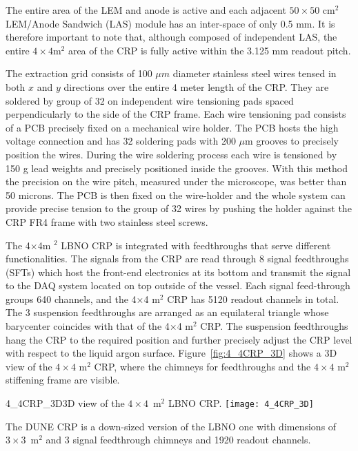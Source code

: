 The entire area of the LEM and anode is active and each adjacent $50\times50$ cm$^2$ LEM/Anode Sandwich (LAS) module has an inter-space of only 0.5 mm. It is therefore important  to note that, although composed of independent LAS, the  entire $4\times 4$m$^2$ area of the CRP is fully active within the 3.125 mm readout pitch.

The extraction grid consists of 100 $\mu$$m$ diameter stainless steel  wires tensed in both $x$ and $y$ directions over the entire 4 meter  length of the CRP. They are soldered by group of 32 on independent  wire tensioning pads spaced perpendicularly to the side of the CRP frame. Each wire  tensioning pad consists of a PCB precisely fixed on a mechanical wire  holder. The PCB hosts the high voltage connection and has 32 soldering pads with 200 $\mu$m grooves to precisely position the  wires. During the wire soldering process each wire is tensioned by 150 g lead weights and precisely positioned inside the grooves. With  this method the precision on the wire pitch, measured under the  microscope, was better than 50 microns. The PCB is then fixed on the  wire-holder and the whole system can provide precise tension to the  group of 32 wires by pushing the holder against the CRP FR4 frame  with two stainless steel screws.

The 4$\times$4m $^2$ LBNO CRP is integrated with feedthroughs that serve  different functionalities. The signals from the CRP are read  through 8 signal feedthroughs (SFTs) which host the front-end electronics at its bottom and transmit the signal to the DAQ system located on top outside of the vessel.  Each signal feed-through groups 640 channels, and the 4$\times$4 m$^2$ CRP has 5120 readout channels in total.  The 3 suspension feedthroughs are arranged as an equilateral triangle whose barycenter coincides with that of the 4$\times$4 m$^2$ CRP.  The suspension feedthroughs hang the CRP to   the required position and further precisely adjust the CRP level  with respect to the liquid argon surface. Figure~\ref{fig:4_4CRP_3D} shows a 3D view of the  $4\times4$ m$^2$ CRP, where the chimneys for feedthroughs and the  $4\times4$ m$^2$ stiffening frame are visible.
 

\begin{cdrfigure}{4_4CRP_3D}{3D view of the $4\times4$~m$^2$ LBNO CRP.}
\texttt{[image: 4\_4CRP\_3D]}  
\end{cdrfigure}

The DUNE CRP is a down-sized version of the LBNO one with  dimensions of $3\times3$~m$^2$ and 3 signal feedthrough chimneys and 1920 readout channels.


